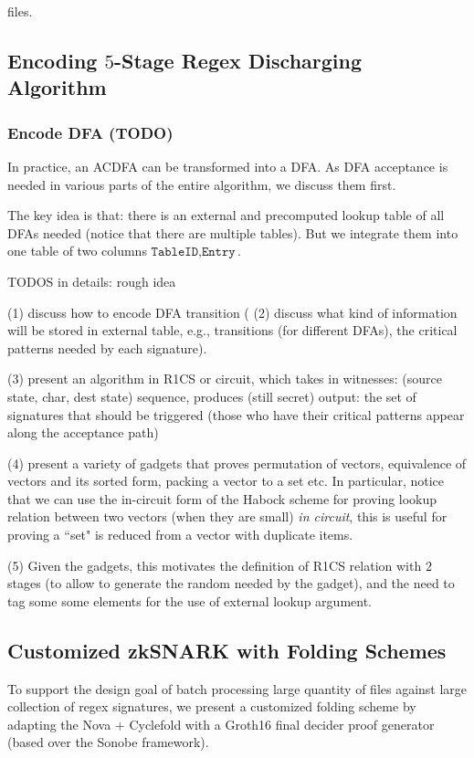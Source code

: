 {files. 

\subsection{Encoding $5$-Stage Regex Discharging Algorithm}
\subsubsection{Encode DFA (TODO)}
In practice, an ACDFA can be transformed into a DFA. As DFA acceptance is
needed in various parts of the entire algorithm, we discuss them first.

The key idea is that: there is an external and precomputed lookup table
of all DFAs needed (notice that there are multiple tables). But we integrate
them into one table of two columns $\texttt{TableID}, \texttt{Entry}$.

TODOS in details: rough idea

(1) discuss how to encode DFA transition
(
(2) discuss what kind of information will be stored in external table, e.g., transitions (for different DFAs), the critical patterns needed by each signature).

(3) present an algorithm in R1CS or circuit, which takes in witnesses: (source state, char, dest state) sequence, produces (still secret) output: the set of signatures that should be triggered (those who have their critical patterns appear along the acceptance path)

(4) present a variety of gadgets that proves permutation of vectors, equivalence of vectors and its sorted form, packing a vector to a set etc. In particular, notice that we can use the in-circuit form of the Habock scheme \cite{Hab22} for proving lookup relation between two vectors (when they are small) {\em in circuit}, this is useful for proving a ``set" is reduced from a vector with duplicate items.

(5) Given the gadgets, this motivates the definition of R1CS relation with $2$ stages (to allow to generate the random needed by the gadget), and 
the need to tag some some elements for the use of external lookup argument.

\subsection{Customized zkSNARK with Folding Schemes}
To support the design goal of batch processing large quantity of files against
large collection of regex signatures, we present a customized
folding scheme by adapting the Nova \cite{Nova} + Cyclefold \cite{CycleFold}
with a Groth16 final decider proof generator (based over the Sonobe
\cite{Sonobe} framework).

}
